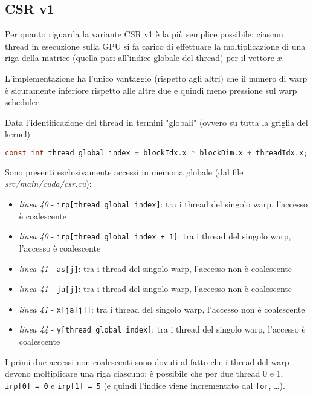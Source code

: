 \documentclass[a4paper,9pt]{extarticle}
\begin{document}
\subsection{CSR v1}
Per quanto riguarda la variante CSR v1 è la più semplice possibile: ciascun thread in esecuzione sulla GPU si fa carico
di effettuare la moltiplicazione di una riga della matrice (quella pari all'indice globale del thread) per il vettore
$x$.

L'implementazione ha l'unico vantaggio (rispetto agli altri)
che il numero di warp è sicuramente inferiore rispetto alle altre due e quindi meno pressione sul warp scheduler.

Data l'identificazione del thread in termini "globali" (ovvero su tutta la griglia del kernel)
\vspace{\baselineskip}

\begin{lstlisting}[language=C]
const int thread_global_index = blockIdx.x * blockDim.x + threadIdx.x;
\end{lstlisting}
\vspace{\baselineskip}

Sono presenti esclusivamente accessi in memoria globale (dal file \textit{src/main/cuda/csr.cu}):
\begin{itemize}
	\item \textit{linea 40} - \texttt{irp[thread\_global\_index]}: tra i thread del singolo warp, l'accesso è coalescente
	\item \textit{linea 40} - \texttt{irp[thread\_global\_index + 1]}: tra i thread del singolo warp, l'accesso è coalescente
	\item \textit{linea 41} - \texttt{as[j]}: tra i thread del singolo warp, l'accesso non è coalescente
	\item \textit{linea 41} - \texttt{ja[j]}: tra i thread del singolo warp, l'accesso non è coalescente
	\item \textit{linea 41} - \texttt{x[ja[j]]}: tra i thread del singolo warp, l'accesso non è coalescente
	\item \textit{linea 44} - \texttt{y[thread\_global\_index]}: tra i thread del singolo warp, l'accesso è coalescente
\end{itemize}

I primi due accessi non coalescenti sono dovuti al fatto che i thread del warp devono
moltiplicare una riga ciascuno: è possibile che per due thread 0 e 1, \texttt{irp[0] = 0} e
\texttt{irp[1] = 5} (e quindi l'indice viene incrementato dal \texttt{for}, \dots).
\end{document}

